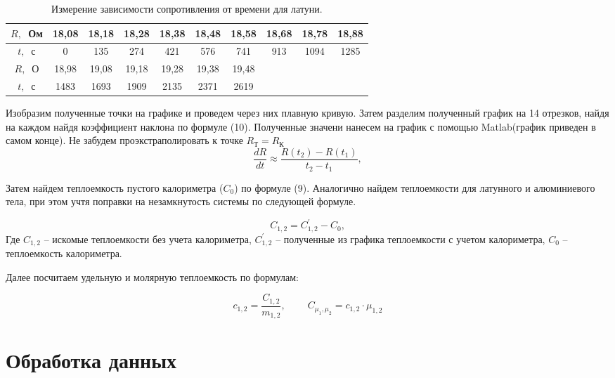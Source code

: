 \FloatBarrier
\begin{center}
	\begin{table}[h]
	\begin{tabular}{| c | c | c | c | c | c | c | c | c | c |} 
	\hline
	$R,~$ Ом & 18,08 & 18,18 & 18,28 & 18,38 & 18,48 & 18,58 & 18,68 & 18,78 & 18,88  \\ \hline
	$t,~$ с & 0 & 135 & 274 & 421 & 576 & 741 & 913 & 1094 & 1285\\ \hline \hline
	$R,~$ О & 18,98 & 19,08 & 19,18 & 19,28 & 19,38 & 19,48 &&&  \\ \hline
	$t,~$ с & 1483 & 1693 & 1909 & 2135 & 2371 & 2619 &&& \\
	\hline
	\end{tabular}
	
	\caption{ Измерение зависимости сопротивления от времени для латуни.}
	\end{table}
\end{center}
\FloatBarrier

Изобразим полученные точки на графике и проведем через них плавную кривую. Затем разделим полученный график на 14 отрезков, найдя на каждом найдя коэффициент наклона по формуле (10). Полученные значени нанесем на график с помощью Matlab(график приведен в самом конце). Не забудем проэкстраполировать к точке $R_{\text{Т}} = R_{\text{К}}$
\begin{equation}
	\dfrac{dR}{dt}\approx\dfrac{R(t_{2}) - R(t_{1})}{t_{2} - t_{1}},
\end{equation}

Затем найдем теплоемкость пустого калориметра ($C_0$) по формуле (9). Аналогично найдем теплоемкости для латунного и алюминиевого тела, при этом учтя поправки на незамкнутость системы по следующей формуле.

\begin{equation}
	C_{1,2} = C^{'}_{1,2} - C_0,
\end{equation}
Где $C_{1,2} $ -- искомые теплоемкости без учета калориметра, $C^{'}_{1,2}$ -- полученные из графика теплоемкости с учетом калориметра, $C_0$ -- теплоемкость калориметра.

Далее посчитаем удельную и молярную теплоемкость по формулам:

\begin{equation}
	c_{1,2} = \frac{C_{1,2}}{m_{1,2}},~~~~~~~~~~ C_{\mu_1, \mu_2} = c_{1,2} \cdot \mu_{1, 2}
\end{equation}

\section{Обработка данных}

